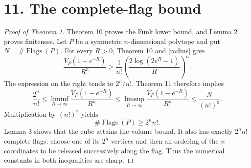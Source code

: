 \documentclass[11pt,a4paper]{article}
\newcommand{\Flags}{\operatorname{Flags}}
\newcommand{\sect}[1]{\section*{#1}}
\begin{document}
\newpage
\sect{11. The complete-flag bound}\label{conclusion}
\begin{proof}[Proof of Theorem 1]
Theorem 10 proves the Funk lower bound, and Lemma 2 proves finiteness.
Let $P$ be a symmetric $n$-dimensional polytope and put
$N=\#\Flags(P)$. For every $R>0$, Theorem 10 and \eqref{radius} give
\[
 \frac{V_P(1-e^{-R})}{R^n}
 \geq\frac1{n!}\left(\frac{2\log(2e^R-1)}R\right)^n.
\]
The expression on the right tends to $2^n/n!$. Theorem 11 therefore
implies
\[
 \frac{2^n}{n!}
 \leq\liminf_{R\to\infty}\frac{V_P(1-e^{-R})}{R^n}
 \leq\limsup_{R\to\infty}\frac{V_P(1-e^{-R})}{R^n}
 \leq\frac{N}{(n!)^2}.
\]
Multiplication by $(n!)^2$ yields
\[
 \boxed{\#\Flags(P)\geq2^n n!}.
\]
Lemma 3 shows that the cube attains the volume bound. It also has exactly
$2^n n!$ complete flags: choose one of its $2^n$ vertices and then an
ordering of the $n$ coordinates to be released successively along the
flag. Thus the numerical constants in both inequalities are sharp.
\end{proof}
\end{document}
